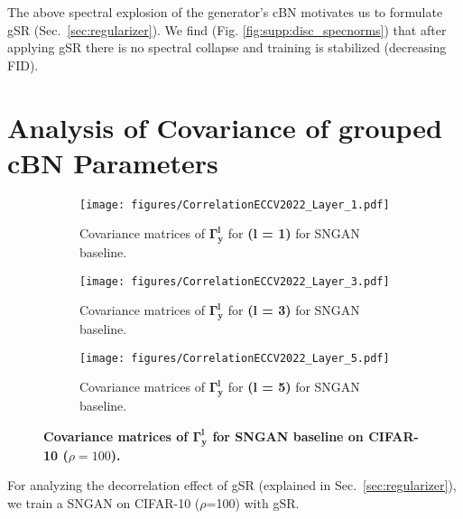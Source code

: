 \documentclass[runningheads,table]{llncs}
\begin{document}
 The above spectral explosion of the generator's cBN motivates us to formulate gSR (Sec.~\ref{sec:regularizer}). We find (Fig. \ref{fig:supp:disc_specnorms}) that after applying gSR there is no spectral collapse and training is stabilized (decreasing FID).

\section{Analysis of Covariance of grouped cBN Parameters}
\label{sec:supp:analysis}
\begin{figure*}[!ht]
     \centering
     \begin{subfigure}[b]{\textwidth}
         \centering
         \texttt{[image: figures/CorrelationECCV2022\_Layer\_1.pdf]}\\[-3ex]
         \caption{Covariance matrices of $\mathbf{\Gamma_y^l}$ for \textbf{(l = 1)} for SNGAN baseline.}
         \label{fig:supp:y equals x}
     \end{subfigure}
     \hfill
     \begin{subfigure}[b]{\textwidth}
         \centering
         \texttt{[image: figures/CorrelationECCV2022\_Layer\_3.pdf]}\\[-3ex]
         \caption{Covariance matrices of $\mathbf{\Gamma_y^l}$ for \textbf{(l = 3)} for SNGAN baseline.}
         \label{fig:supp:three sin x}
     \end{subfigure}
     \hfill
     \begin{subfigure}[b]{\textwidth}
         \centering
         \texttt{[image: figures/CorrelationECCV2022\_Layer\_5.pdf]}\\[-3ex]
         \caption{Covariance matrices of $\mathbf{\Gamma_y^l}$ for \textbf{(l = 5)} for SNGAN baseline.}
         \label{fig:supp:five over x}
     \end{subfigure}
    \caption{\textbf{Covariance matrices of $\mathbf{\Gamma_y^l}$ for SNGAN baseline on CIFAR-10 ($\rho = 100$).}}
    \label{fig:supp:three graphs}
\end{figure*}
\vspace{-3mm}
For analyzing the decorrelation effect of gSR (explained in Sec.~\ref{sec:regularizer}), we train a SNGAN on CIFAR-10 ($\rho$=100) with gSR. 
\end{document}
